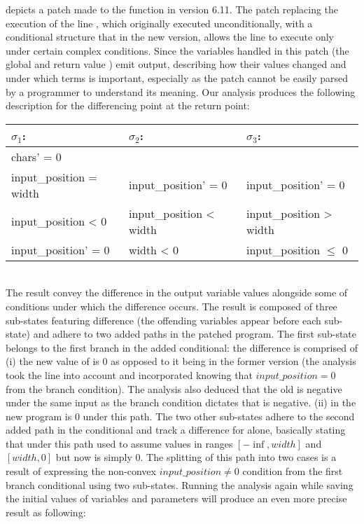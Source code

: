  depicts a patch made to the  function in version 6.11. The patch replacing the execution of the line , which originally executed unconditionally, with a conditional structure that in the new version, allows the line to execute only under certain complex conditions. Since the variables handled in this patch (the global  and return value ) emit output, describing how their values changed and under which terms is important, especially as the patch cannot be easily parsed by a programmer to understand its meaning. Our analysis produces the following description for the differencing point at the return point:
\\
\begin{tabular}{l|l|l}
$\sigma_1$:                 & $\sigma_2$:                   & $\sigma_3$:
\\ \hline
chars' = 0                &                               &
\\
input\_position = width   & input\_position' = 0        & input\_position' = 0
\\
input\_position < 0       & input\_position < width     & input\_position > width
\\
input\_position' = 0      & width < 0                   & input\_position $\leq$ 0
\\ \hline
\end{tabular}
\\
The result convey the difference in the output variable values alongside some of conditions under which the difference occurs. The result is composed of three sub-states featuring difference (the offending variables appear before each sub-state) and adhere to two added paths in the patched program. The first sub-state belongs to the first branch in the added conditional: the difference is comprised of (i) the new value of  is 0 as opposed to it being  in the former version (the analysis took the  line into account and incorporated knowing that $input\_position = 0$ from the branch condition). The analysis also deduced that the old  is negative under the same input as the branch condition dictates that  is negative. (ii)  in the new program is 0 under this path. The two other sub-states adhere to the second added path in the conditional and track a difference for  alone, basically stating that  under this path used to assume values in ranges $[-\inf,width]$ and $[width,0]$ but now is simply 0. The splitting of this path into two cases is a result of expressing the non-convex $input\_position \neq 0$ condition from the first branch conditional using two sub-states. Running the analysis again while saving the initial values of variables and parameters will produce an even more precise result as following:
